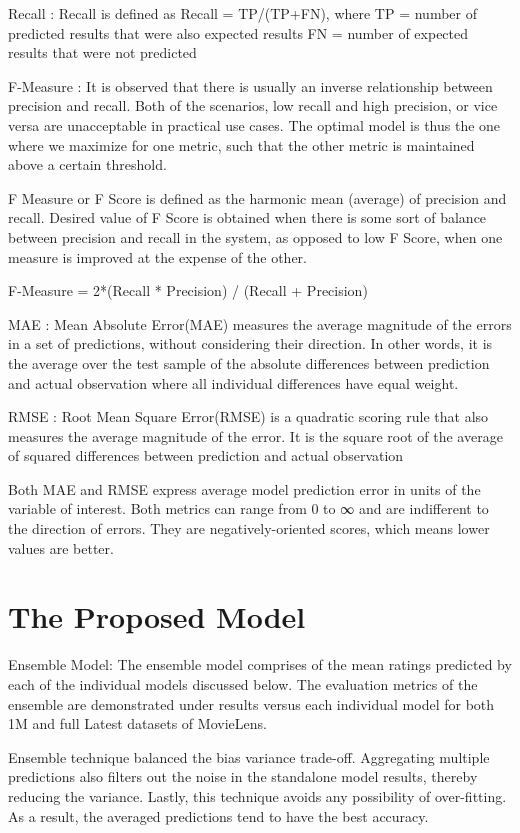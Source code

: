 \documentclass[sigconf]{acmart}
\begin{document}
Recall : Recall is defined as
Recall = TP/(TP+FN), where
TP = number of predicted results that were also expected results 
FN = number of expected results that were not predicted

F-Measure : It is observed\cite{evalmetrics} that there is usually an inverse relationship between precision and recall. Both of the scenarios, low recall and high precision, or vice versa are unacceptable in practical use cases. The optimal model is thus the one where we maximize for one metric, such that the other metric is maintained above a certain threshold. 

F Measure or F Score is defined as the harmonic mean (average) of precision and recall. Desired value of F Score is obtained when there is some sort of balance between precision and recall in the system, as opposed to low F Score, when one measure is improved at the expense of the other.

F-Measure = 2*(Recall * Precision) / (Recall + Precision)

MAE : Mean Absolute Error(MAE) measures the average magnitude of the errors in a set of predictions, without considering their direction. In other words, it is the average over the test sample of the absolute differences between prediction and actual observation where all individual differences have equal weight.

RMSE : Root Mean Square Error(RMSE) is a quadratic scoring rule that also measures the average magnitude of the error. It is the square root of the average of squared differences between prediction and actual observation

Both MAE and RMSE express average model prediction error in units of the variable of interest. Both metrics can range from 0 to ∞ and are indifferent to the direction of errors. They are negatively-oriented scores, which means lower values are better\cite{maermse}.


\section{The Proposed Model}\label{sec:framework}
Ensemble Model: The ensemble model comprises of the mean ratings predicted by each of the individual models discussed below. The evaluation metrics of the ensemble are demonstrated under results versus each individual model for both 1M and full Latest datasets of MovieLens.

 Ensemble technique balanced the bias variance trade-off. Aggregating multiple predictions also filters out the noise in the standalone model results, thereby reducing the variance. Lastly, this technique avoids any possibility of over-fitting. As a result, the averaged predictions tend to have the best accuracy.
 
\end{document}
